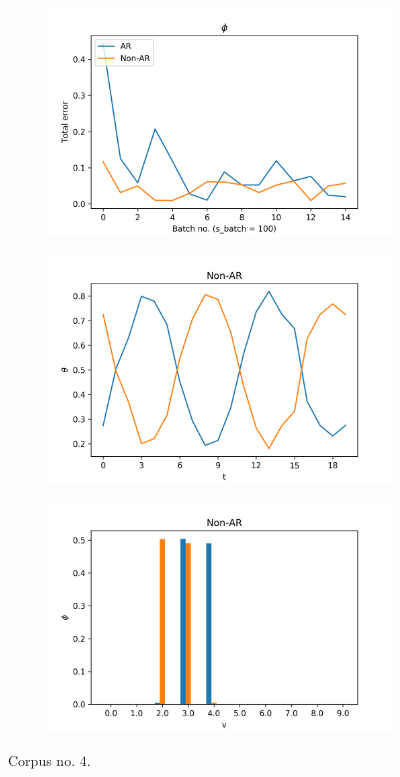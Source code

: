 \documentclass[12pt]{article}
\begin{document}
\begin{figure}[H]
  \begin{subfigure}[b]{0.3\textwidth}
    \includegraphics[width=\linewidth]{performance_phis_experiment-1|overlapping-yes_dataset-4.png}
  \end{subfigure}%
  \begin{subfigure}[b]{0.3\textwidth}
    \includegraphics[width=\linewidth]{latent_thetas_Non-AR_experiment-1|overlapping-yes_dataset-4.png}
  \end{subfigure}%
  \begin{subfigure}[b]{0.3\textwidth}
    \includegraphics[width=\linewidth]{latent_phis_Non-AR_experiment-1|overlapping-yes_dataset-4.png}
  \end{subfigure}%
  \caption{Corpus no. $4$.}
\end{figure}
\end{document}
